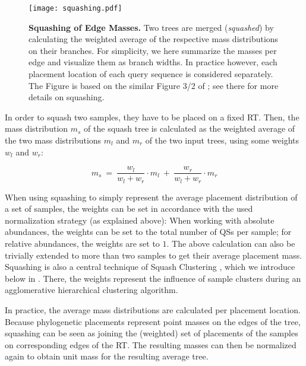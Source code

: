 \begin{figure}[!htb]
    \centering
    \texttt{[image: squashing.pdf]}
    \caption[Squashing of Edge Masses]{
        \textbf{Squashing of Edge Masses.}
        Two trees are merged (\emph{squashed}) by calculating the weighted average
        of the respective mass distributions on their branches.
        For simplicity, we here summarize the masses per edge and visualize them as branch widths.
        In practice however, each placement location of each query sequence is considered separately.
        The Figure is based on the similar Figure 3/2 of \cite{Matsen2011a}; see there for more details on squashing.
    }
    \label{fig:squashing}
\end{figure}

In order to squash two samples, they have to be placed on a fixed \ac{RT}.
Then, the mass distribution $m_s$ of the squash tree is calculated as
the weighted average of the two mass distributions $m_l$ and $m_r$ of the two input trees,
using some weights $w_l$ and $w_r$:

\begin{equation}
    \label{ch:Foundations:sec:PhylogeneticPlacement:eq:Squashing}
    m_s ~=~ \frac{w_l}{w_l + w_r} \cdot m_l ~+~ \frac{w_r}{w_l + w_r} \cdot m_r
\end{equation}

When using squashing to simply represent the average placement distribution of a set of samples,
the weights can be set in accordance with the used normalization strategy (as explained above):
When working with absolute abundances, the weights can be set to the total number of \acp{QS} per sample;
for relative abundances, the weights are set to $1$.
The above calculation can also be trivially extended to more than two samples to get their average placement mass.
Squashing is also a central technique of Squash Clustering \citep{Matsen2011a}, which we introduce below in
.
There, the weights represent the influence of sample clusters during an agglomerative hierarchical clustering algorithm.

In practice, the average mass distributions are calculated per placement location.
Because phylogenetic placements represent point masses on the edges of the tree,
squashing can be seen as joining the (weighted) set of placements of the samples on corresponding edges of the \ac{RT}.
The resulting masses can then be normalized again to obtain unit mass for the resulting average tree.

